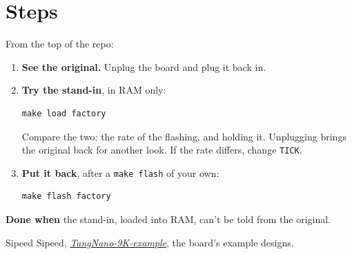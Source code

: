 \documentclass[11pt,a4paper]{article}
\begin{document}
\section*{Steps}

From the top of the repo:

\begin{enumerate}
  \item \textbf{See the original.} Unplug the board and plug it back in.
  \item \textbf{Try the stand-in}, in RAM only:
\begin{verbatim}
make load factory
\end{verbatim}
  Compare the two: the rate of the flashing, and  holding it. Unplugging brings the original back for another look. If the rate differs, change \texttt{TICK}.
  \item \textbf{Put it back}, after a \texttt{make flash} of your own:
\begin{verbatim}
make flash factory
\end{verbatim}
\end{enumerate}

\textbf{Done when} the stand-in, loaded into RAM, can’t be told from the original.

\begin{thebibliography}{Sipeed}
 Sipeed, \href{https://github.com/sipeed/TangNano-9K-example}{\textit{TangNano-9K-example}}, the board’s example designs.
\end{thebibliography}

\revisiontable
\end{document}
